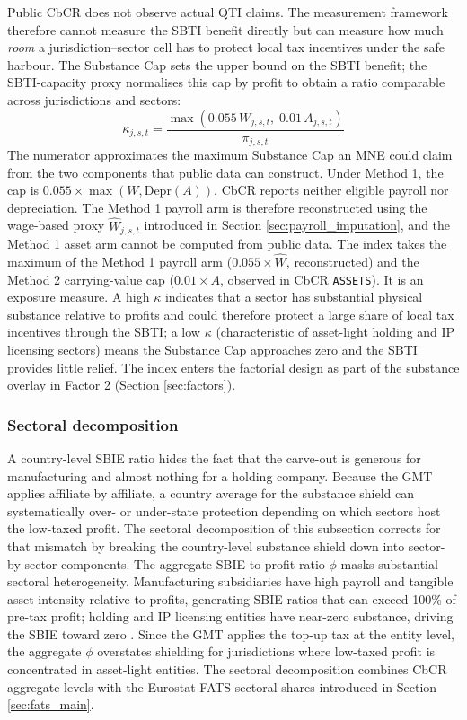\documentclass[11pt,a4paper]{article}
\newcommand{\code}[1]{\texttt{#1}}
\begin{document}
Public CbCR does not observe actual QTI claims. The measurement framework therefore cannot measure the SBTI benefit directly but can measure how much \emph{room} a jurisdiction--sector cell has to protect local tax incentives under the safe harbour. The Substance Cap sets the upper bound on the SBTI benefit; the SBTI-capacity proxy normalises this cap by profit to obtain a ratio comparable across jurisdictions and sectors:
\begin{equation}\label{eq:sbti_capacity}
\kappa_{j,s,t} = \frac{\max\!\left(0.055\,W_{j,s,t},\; 0.01\,A_{j,s,t}\right)}{\pi_{j,s,t}}
\end{equation}
The numerator approximates the maximum Substance Cap an MNE could claim from the two components that public data can construct. Under Method 1, the cap is $0.055 \times \max(W, \text{Depr}(A))$. CbCR reports neither eligible payroll nor depreciation. The Method 1 payroll arm is therefore reconstructed using the wage-based proxy $\hat{W}_{j,s,t}$ introduced in Section \ref{sec:payroll_imputation}, and the Method 1 asset arm cannot be computed from public data. The index takes the maximum of the Method 1 payroll arm ($0.055 \times \hat{W}$, reconstructed) and the Method 2 carrying-value cap ($0.01 \times A$, observed in CbCR \code{ASSETS}). It is an exposure measure. A high $\kappa$ indicates that a sector has substantial physical substance relative to profits and could therefore protect a large share of local tax incentives through the SBTI; a low $\kappa$ (characteristic of asset-light holding and IP licensing sectors) means the Substance Cap approaches zero and the SBTI provides little relief. The index enters the factorial design as part of the substance overlay in Factor 2 (Section \ref{sec:factors}).

\subsubsection{Sectoral decomposition}\label{sec:sbie_decomp}

A country-level SBIE ratio hides the fact that the carve-out is generous for manufacturing and almost nothing for a holding company. Because the GMT applies affiliate by affiliate, a country average for the substance shield can systematically over- or under-state protection depending on which sectors host the low-taxed profit. The sectoral decomposition of this subsection corrects for that mismatch by breaking the country-level substance shield down into sector-by-sector components. The aggregate SBIE-to-profit ratio $\phi$ masks substantial sectoral heterogeneity. Manufacturing subsidiaries have high payroll and tangible asset intensity relative to profits, generating SBIE ratios that can exceed 100\% of pre-tax profit; holding and IP licensing entities have near-zero substance, driving the SBIE toward zero \citep{devereux2023}. Since the GMT applies the top-up tax at the entity level, the aggregate $\phi$ overstates shielding for jurisdictions where low-taxed profit is concentrated in asset-light entities. The sectoral decomposition combines CbCR aggregate levels with the Eurostat FATS sectoral shares introduced in Section \ref{sec:fats_main}.
\end{document}
